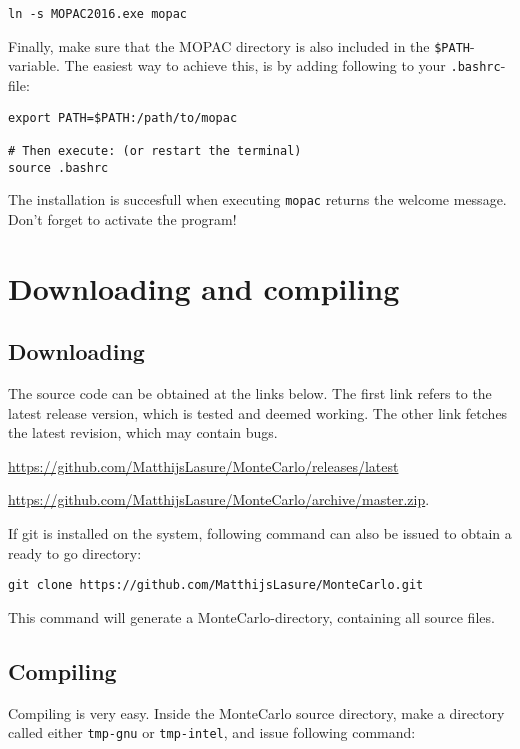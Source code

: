 \begin{lstlisting}[caption=Symlink to MOPAC]
ln -s MOPAC2016.exe mopac
\end{lstlisting}

Finally, make sure that the MOPAC directory is also included in the 
\verb|$PATH|-variable. The easiest way to achieve this, is by adding following 
to your \verb|.bashrc|-file:
\begin{lstlisting}[caption=changing the path variable]
export PATH=$PATH:/path/to/mopac

# Then execute: (or restart the terminal)
source .bashrc
\end{lstlisting}

The installation is succesfull when executing \verb|mopac| returns the welcome 
message. Don't forget to activate the program!

\section{Downloading and compiling}

\subsection{Downloading}
The source code can be obtained at the links below. The first link refers to 
the latest release version, which is tested and deemed working. The other link 
fetches the latest revision, which may contain bugs.

\url{https://github.com/MatthijsLasure/MonteCarlo/releases/latest}

\url{https://github.com/MatthijsLasure/MonteCarlo/archive/master.zip}.

If git is installed on the system, following command can also be issued to 
obtain a ready to go directory:

\begin{lstlisting}[caption=Clone with git]
git clone https://github.com/MatthijsLasure/MonteCarlo.git
\end{lstlisting}

This command will generate a MonteCarlo-directory, containing all source files.

\subsection{Compiling}
Compiling is very easy.
Inside the MonteCarlo source directory, make a directory called either 
\verb|tmp-gnu| or \verb|tmp-intel|, and issue following command:

